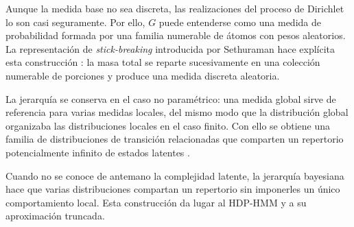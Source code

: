Aunque la medida base no sea discreta, las realizaciones del proceso de Dirichlet lo son casi seguramente. Por ello, $G$ puede entenderse como una medida de probabilidad formada por una familia numerable de átomos con pesos aleatorios. La representación de \emph{stick-breaking} introducida por Sethuraman hace explícita esta construcción \cite{sethuraman1994}: la masa total se reparte sucesivamente en una colección numerable de porciones y produce una medida discreta aleatoria.

La jerarquía se conserva en el caso no paramétrico: una medida global sirve de referencia para varias medidas locales, del mismo modo que la distribución global organizaba las distribuciones locales en el caso finito. Con ello se obtiene una familia de distribuciones de transición relacionadas que comparten un repertorio potencialmente infinito de estados latentes \cite{teh2006}.

Cuando no se conoce de antemano la complejidad latente, la jerarquía bayesiana hace que varias distribuciones compartan un repertorio sin imponerles un único comportamiento local. Esta construcción da lugar al HDP-HMM y a su aproximación truncada.
